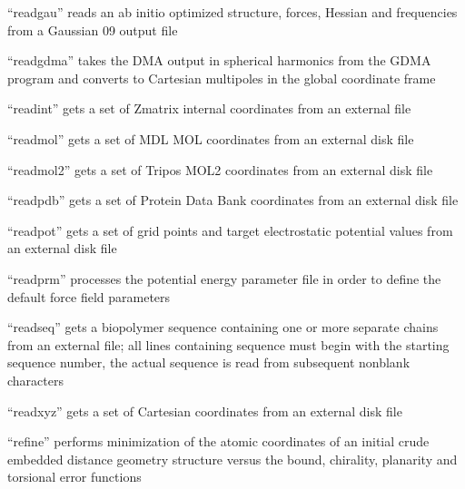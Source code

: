 \documentclass[letterpaper,11pt,english]{sphinxmanual}
\begin{document}
“readgau” reads an ab initio optimized structure, forces,
Hessian and frequencies from a Gaussian 09 output file


“readgdma” takes the DMA output in spherical harmonics from
the GDMA program and converts to Cartesian multipoles in
the global coordinate frame


“readint” gets a set of Z\sphinxhyphen{}matrix internal coordinates
from an external file


“readmol” gets a set of MDL MOL coordinates from
an external disk file


“readmol2” gets a set of Tripos MOL2 coordinates from an
external disk file


“readpdb” gets a set of Protein Data Bank coordinates
from an external disk file


“readpot” gets a set of grid points and target electrostatic
potential values from an external disk file


“readprm” processes the potential energy parameter file
in order to define the default force field parameters


“readseq” gets a biopolymer sequence containing one or more
separate chains from an external file; all lines containing
sequence must begin with the starting sequence number, the
actual sequence is read from subsequent nonblank characters


“readxyz” gets a set of Cartesian coordinates from
an external disk file


“refine” performs minimization of the atomic coordinates
of an initial crude embedded distance geometry structure versus
the bound, chirality, planarity and torsional error functions

\end{document}
